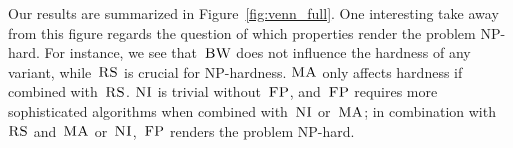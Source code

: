 Our results are summarized in
Figure~\ref{fig:venn_full}.
One interesting take away from this figure regards
the question of which properties render the problem
NP-hard. For instance, we see that~$\textsc{BW}$
does not influence the hardness of any variant,
while~$\textsc{RS}$ is crucial for NP-hardness.
$\textsc{MA}$ only affects hardness if combined with~$\textsc{RS}$.
$\textsc{NI}$ is trivial without~$\textsc{FP}$, and~$\textsc{FP}$ requires
more sophisticated algorithms when combined with~$\textsc{NI}$ or~$\textsc{MA}$;
in combination with~$\textsc{RS}$ and~$\textsc{MA}$ or~$\textsc{NI}$,~$\textsc{FP}$ renders the
problem NP-hard.
